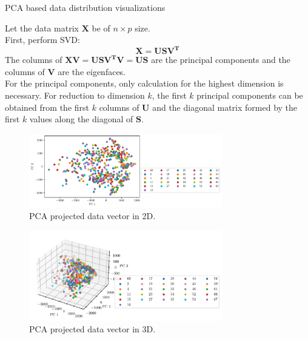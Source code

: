 \documentclass[a4paper]{exam}
\begin{document}
\begin{questions}
    \question PCA based data distribution visualizations

    Let the data matrix $\mathbf{X}$ be of $n \times p$ size.\\
    First, perform SVD:
    \begin{equation}
        \mathbf{X}=\mathbf{USV^T}
    \end{equation}
    The columns of $\mathbf{XV}=\mathbf{USV^TV}=\mathbf{US}$ are the principal components and the columns of $\mathbf{V}$ are the eigenfaces.\\
    For the principal components, only calculation for the highest dimension is necessary. For reduction to
    dimension $k$, the first $k$ principal components can be obtained from the first $k$ columns of
    $\mathbf{U}$ and the diagonal matrix formed by the first $k$ values along the diagonal of $\mathbf{S}$.

    \begin{figure}[h]
        \centering
        \includegraphics[width=0.75\textwidth]{pca_2d}
        \caption{PCA projected data vector in 2D.}
        \label{fig:pca_2d}
    \end{figure}

    \begin{figure}[ht]
        \centering
        \includegraphics[width=0.75\textwidth]{pca_3d}
        \caption{PCA projected data vector in 3D.}
        \label{fig:pca_3d}
    \end{figure}


\end{questions}
\end{document}
